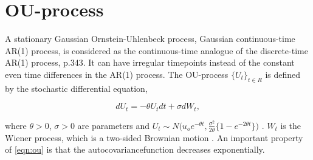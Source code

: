 \section{OU-process}

\noindent A stationary Gaussian Ornstein-Uhlenbeck process, Gaussian continuous-time AR(1) process, is considered as the continuous-time analogue of the discrete-time AR(1) process, \cite{timeseries} p.343. It can have irregular timepoints instead of the constant even time differences in the AR(1) process. The OU-process $\{U_t\}_{t \in R}$ is defined by the stochastic differential equation,

\begin{equation}
dU_t = -\theta U_t dt + \sigma dW_t,
\label{eqn:ou}
\end{equation}

\noindent where $\theta > 0$, $\sigma > 0$ are parameters and $U_t \sim N\big(u_o e^{-\theta t}, \frac{\sigma^2}{2\theta}\big\{1 - e^{-2\theta t}\big\}\big)$ \cite{IBE2013263}. ${W_t}$ is the Wiener process, which is a two-sided Brownian motion \cite{voutilainen_viitasaari_ilmonen_2019}. An important property of \ref{eqn:ou} is that the autocovariancefunction decreases exponentially.
